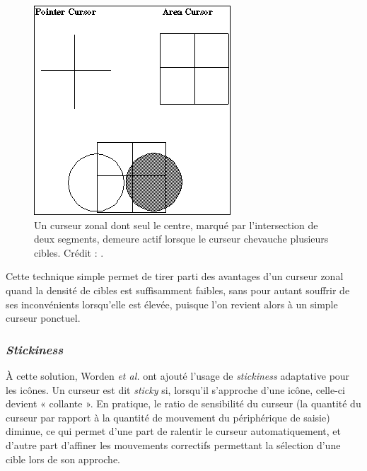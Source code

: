 	\begin{figure}[ht]
		\centering
		\includegraphics[width=\textwidth]{figures/ch2/areaCursor}
		\caption[\emph{Area Cursor} avec \emph{hot spot}]{Un curseur zonal dont seul le centre, marqué par l'intersection de deux segments, demeure actif lorsque le curseur chevauche plusieurs cibles. Crédit : \cite{worden1997making}.}
		\label{fig:areaCursor}
	\end{figure}
	
	Cette technique simple permet de tirer parti des avantages d'un curseur zonal quand la densité de cibles est suffisamment faibles, sans pour autant souffrir de ses inconvénients lorsqu'elle est élevée, puisque l'on revient alors à un simple curseur ponctuel.
	
		\subsubsection{\emph{Stickiness}}
	À cette solution, Worden \emph{et al.} ont ajouté l'usage de \emph{stickiness} adaptative pour les icônes. Un curseur est dit \emph{sticky} si, lorsqu'il s'approche d'une icône, celle-ci devient « collante ». En pratique, le ratio de sensibilité du curseur (la quantité du curseur par rapport à la quantité de mouvement du périphérique de saisie) diminue, ce qui permet d'une part de ralentir le curseur automatiquement, et d'autre part d'affiner les mouvements correctifs permettant la sélection d'une cible lors de son approche.
	
